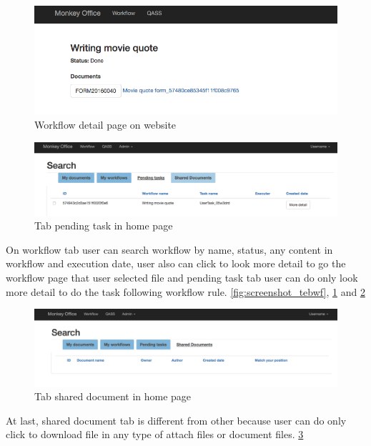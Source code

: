 \begin{figure}[h!]

	\centering
	\includegraphics[scale=0.3]{res/wf_detail_page}
	\caption{Workflow detail page on website}
	\label{fig:screenshot_wfdetail}
\end{figure}

\begin{figure}[h!]

	\centering
	\includegraphics[scale=0.3]{res/pending_page}
	\caption{Tab pending task in home page}
	\label{fig:screenshot_pending}
\end{figure}

 On workflow tab user can search workflow by name, status, any content in workflow and execution date, user also can click to look more detail to go the workflow page that user selected file and pending task tab user can do only look more detail to do the task following workflow rule. \ref{fig:screenshot_tebwf}, \ref{fig:screenshot_wfdetail} and \ref{fig:screenshot_pending}

 \begin{figure}[h!]

	\centering
	\includegraphics[scale=0.3]{res/tab_shared_page}
	\caption{Tab shared document in home page}
	\label{fig:screenshot_shared}
\end{figure}

At last, shared document tab is different from other because user can do only click to download file in any type of attach files or document files. \ref{fig:screenshot_shared}




